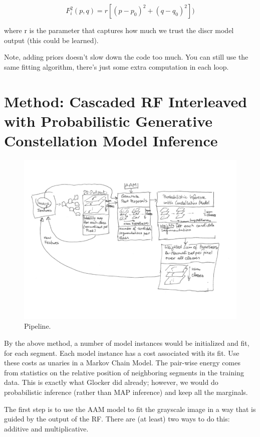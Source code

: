 \documentclass[10pt,twocolumn,letterpaper]{article}
\begin{document}
\[ F_i^2(p,q) = r[(p-p_0)^2+(q-q_0)^2]) \]

where r is the parameter that captures how much we trust the discr model output (this could be learned).

Note, adding priors doesn't slow down the code too much.  You can still use the same fitting algorithm, there's just some extra computation in each loop.


\section{Method: Cascaded RF Interleaved with Probabilistic Generative Constellation Model Inference}
\begin{figure}[t]
\begin{center}
\includegraphics[width=\textwidth]{Pipeline.png} %
\caption{Pipeline.}
\label{fig:pipeline}
\end{center}
\end{figure}



By the above method, a number of model instances would be initialized and fit, for each segment.  Each model instance has a cost associated with its fit.  Use these costs as unaries in a Markov Chain Model.  The pair-wise energy comes from statistics on the relative position of neighboring segments in the training data.  This is exactly what Glocker did already; however, we would do probabilistic inference (rather than MAP inference) and keep all the marginals.


The first step is to use the AAM model to fit the grayscale image in a way that is guided by the output of the RF.  There are (at least) two ways to do this: additive and multiplicative.
\end{document}
